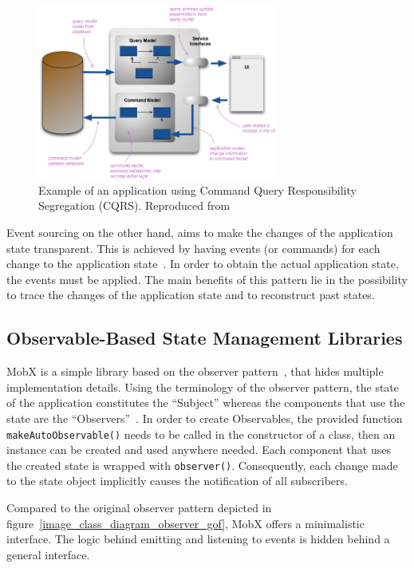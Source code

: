 \begin{figure}
\centering
\includegraphics[width=0.7\textwidth]{images/Untitled_10.png}
  \caption{Example of an application using Command Query
  Responsibility Segregation (CQRS). Reproduced from~\cite{cqrs}}
  \label{image_with_cqrs}
\end{figure}

Event sourcing on the other hand, aims to make the changes of the
application state transparent. This is achieved by having events (or
commands) for each change to the application state~\cite{event_sourcing}. In order to
obtain the actual application state, the events must be applied. The
main benefits of this pattern lie in the possibility to trace the
changes of the application state and to reconstruct past states.

\clearpage
\clearpage
\hypertarget{observable-state-management-libraries}{%
\subsection{Observable-Based State Management
Libraries}\label{observable-state-management-libraries}}

MobX is a simple library based on the observer pattern~\cite{gang_of_four},
that hides multiple implementation details. Using the terminology of the
observer pattern, the state of the application constitutes the
``Subject'' whereas the components that use the state are the
``Observers''~\cite{gang_of_four}.
In order to create Observables, the provided function
\texttt{makeAutoObservable()} needs to be called in
the constructor of a class, then an instance can be created
and used
anywhere needed. Each component that uses the created state
is wrapped with \texttt{observer()}. Consequently, each change
made to the state object implicitly causes the notification
of all subscribers.

Compared to the original observer pattern depicted in figure~\ref{image_class_diagram_observer_gof},
MobX offers a minimalistic interface. The logic behind emitting and
listening to events is hidden behind a general interface.

